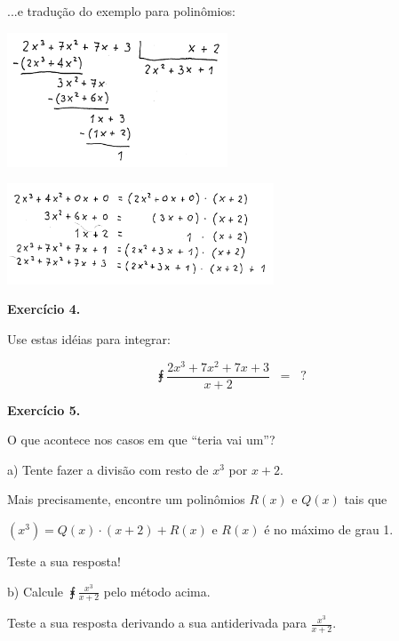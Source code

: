 \documentclass[oneside,12pt]{article}
\begin{document}
\newpage

...e tradução do exemplo para polinômios:

\includegraphics[height=4cm]{2020-1-C2/20201118_C2_div_com_resto_2.pdf}

\includegraphics[height=3cm]{2020-1-C2/20201118_C2_div_com_resto_3.pdf}

\newpage


{\bf Exercício 4.}

\ssk

Use estas idéias para integrar:

$$\intx{\frac{2x^3 + 7x^2 + 7x + 3}{x+2}} \;\; = \;\; ?$$



\newpage

{\bf Exercício 5.}

\ssk

O que acontece nos casos em que ``teria vai um''?

\ssk

a) Tente fazer a divisão com resto de $x^3$ por $x+2$.

Mais precisamente, encontre um polinômios $R(x)$ e $Q(x)$ tais que

$(x^3) = Q(x) · (x+2) + R(x)$ e $R(x)$ é no máximo de grau 1.

Teste a sua resposta!

\ssk

b) Calcule $\intx{\frac{x^3}{x+2}}$ pelo método acima.

Teste a sua resposta derivando a sua antiderivada para $\frac{x^3}{x+2}$.
\end{document}
